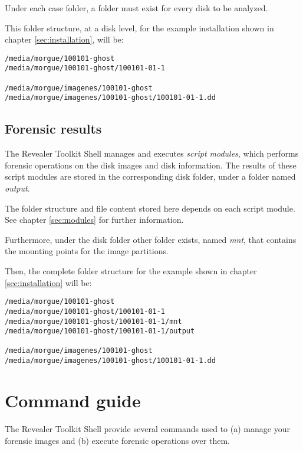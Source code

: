 \documentclass[a4paper,11pt,oneside]{report}
\begin{document}
Under each case folder, a folder must exist for every disk to be analyzed. 

This folder structure, at a disk level, for the example installation shown in chapter \ref{sec:installation}, will be:

\begin{verbatim}
/media/morgue/100101-ghost
/media/morgue/100101-ghost/100101-01-1

/media/morgue/imagenes/100101-ghost
/media/morgue/imagenes/100101-ghost/100101-01-1.dd
\end{verbatim}


\section{Forensic results}

The Revealer Toolkit Shell manages and executes \emph{script modules}, which performs forensic operations on the disk images and disk information. The results of these script modules are stored in the corresponding disk folder, under a folder named \emph{output}.

The folder structure and file content stored here depends on each script module. See chapter \ref{sec:modules} for further information.

Furthermore, under the disk folder other folder exists, named \emph{mnt}, that contains the mounting points for the image partitions. 

Then, the complete folder structure for the example shown in chapter \ref{sec:installation} will be:

\begin{verbatim}
/media/morgue/100101-ghost
/media/morgue/100101-ghost/100101-01-1
/media/morgue/100101-ghost/100101-01-1/mnt
/media/morgue/100101-ghost/100101-01-1/output

/media/morgue/imagenes/100101-ghost
/media/morgue/imagenes/100101-ghost/100101-01-1.dd
\end{verbatim}




\chapter{Command guide}

The Revealer Toolkit Shell provide several commands used to (a) manage your forensic images and (b) execute forensic operations over them.
\end{document}
